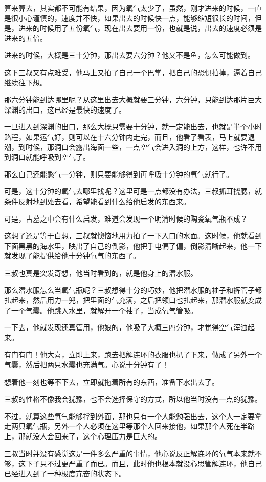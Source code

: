 算来算去，其实都不可能有结果，因为氧气太少了，虽然，刚才进来的时候，一直是很小心谨慎的，速度并不快，如果出去的时候快一点，能够缩短很长的时间，但是，进来的时候用了五份氧气，现在出去要用一份，也就是说，出去的速度必须是进来的五倍。

进来的时候，大概是三十分钟，那出去要六分钟？他又不是鱼，怎么可能做到。

这下三叔又有点难受，他马上又拍了自己一个巴掌，把自己的恐惧拍掉，逼着自己继续往下想。

那六分钟能到达哪里呢？从这里出去大概就要三分钟，六分钟，只能到达那片巨大深渊的出口，这已经是最快的速度了。

一旦进入到深渊的出口，那么大概只需要十分钟，就一定能出去，也就是半个小时路程，如果运气好，则可以在十六分钟内走完，而且，他看了看表，马上就要退潮，到时候，那洞口会露出海面一些，一点空气会进入洞的上方，这样，也许不用到洞口就能呼吸到空气了。

那么自己还能憋气一分钟，则只要能够得到再呼吸十分钟的氧气就行了。

可是，这十分钟的氧气去哪里找呢？这里可是一点都没有办法，三叔抓耳挠腮，就条件反射地到处去看，希望能看到什么给他启发的东西来。

可是，古墓之中会有什么启发，难道会发现一个明清时候的陶瓷氧气瓶不成？

这想了还是等于白想，三叔就懊恼地用力拍了一下入口的水面。这时候，他就看到下面黑黑的海水里，映出了自己的倒影，他把手电偏了偏，倒影清晰起来，他一下就发现了能提供给他十分钟氧气的东西了。

三叔也真是突发奇想，他当时看到的，就是他身上的潜水服。

那么潜水服怎么当氧气瓶呢？三叔想得十分的巧妙，他把潜水服的袖子和裤管子都扎起来，然后用力一兜，把里面的气充满，之后把领口也扎起来，那潜水服就变成了一个气囊。他跳入水里，就解开一个袖子，当成氧气管吸。

一下去，他就发现还真管用，他娘的，他吸了大概三四分钟，才觉得空气浑浊起来。

有门有门！他大喜，立即上来，跑去把解连环的衣服也扒了下来，做成了另外一个气囊，然后把两只水囊也充满气。心说十分钟有了！

想着他一刻也等不下去，立即就拖着所有的东西，准备下水出去了。

三叔的性格不像我会犹豫，也不会选择保守的方式，所以他当时没有一点的犹豫。

不过，就算这些氧气能够撑到外面，那也只有一个人能勉强出去，这个人一定要拿走两只氧气瓶，另外一个人必须在这里等那个人回来接他，如果那个人死在半路上，那就没人会回来了，这个心理压力是巨大的。

三叔当时并没有感觉这是一件多么严重的事情，他心说反正解连环的氧气本来就不够，这下子只不过更严重了而已。而且，此时他也根本就没心思管解连环，他自己已经进入到了一种极度亢奋的状态下。

